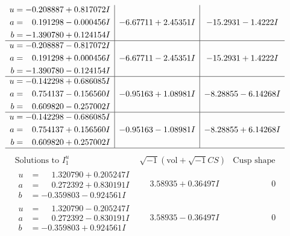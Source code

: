 \documentclass[1p]{elsarticle_modified}
\theoremstyle{definition}
\newcommand{\I}{\sqrt{-1}}
\begin{document}
$$\begin{array}{c|c|c}
\begin{aligned}
u &= -0.208887 + 0.817072 I \\
a &= \phantom{-}0.191298 - 0.000456 I \\
b &= -1.390780 + 0.124154 I\end{aligned}
 & -6.67711 + 2.45351 I & -15.2931 - 1.4222 I \\ \hline\begin{aligned}
u &= -0.208887 - 0.817072 I \\
a &= \phantom{-}0.191298 + 0.000456 I \\
b &= -1.390780 - 0.124154 I\end{aligned}
 & -6.67711 - 2.45351 I & -15.2931 + 1.4222 I \\ \hline\begin{aligned}
u &= -0.142298 + 0.686085 I \\
a &= \phantom{-}0.754137 - 0.156560 I \\
b &= \phantom{-}0.609820 - 0.257002 I\end{aligned}
 & -0.95163 + 1.08981 I & -8.28855 - 6.14268 I \\ \hline\begin{aligned}
u &= -0.142298 - 0.686085 I \\
a &= \phantom{-}0.754137 + 0.156560 I \\
b &= \phantom{-}0.609820 + 0.257002 I\end{aligned}
 & -0.95163 - 1.08981 I & -8.28855 + 6.14268 I\\
 \hline 
 \end{array}$$\newpage$$\begin{array}{c|c|c}  
\text{Solutions to }I^u_{1}& \I (\text{vol} + \sqrt{-1}CS) & \text{Cusp shape}\\
 \hline 
\begin{aligned}
u &= \phantom{-}1.320790 + 0.205247 I \\
a &= \phantom{-}0.272392 + 0.830191 I \\
b &= -0.359803 - 0.924561 I\end{aligned}
 & \phantom{-}3.58935 + 0.36497 I & \phantom{-0.000000 } 0 \\ \hline\begin{aligned}
u &= \phantom{-}1.320790 - 0.205247 I \\
a &= \phantom{-}0.272392 - 0.830191 I \\
b &= -0.359803 + 0.924561 I\end{aligned}
 & \phantom{-}3.58935 - 0.36497 I & \phantom{-0.000000 } 0 \\ \hline\begin{aligned}

\end{aligned}
\end{array}$$
\end{document}
